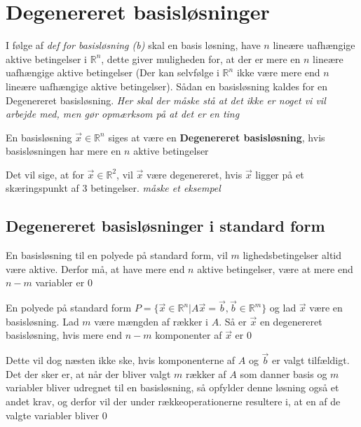 \section{Degenereret basisløsninger}
I følge af \textit{def for basisløsning (b)} skal en basis løsning, have $n$ lineære uafhængige aktive betingelser i $\mathds{R}^n$, dette giver muligheden for, at der er mere en $n$ lineære uafhængige aktive betingelser (Der kan selvfølge i $\mathds{R}^n$ ikke være mere end $n$ lineære uafhængige aktive betingelser). Sådan en basisløsning kaldes for en Degenereret basisløsning. \textit{Her skal der måske stå at det ikke er noget vi vil arbejde med, men gør opmærksom på at det er en ting}
\\
\begin{defn}
En basisløsning $\vec{x}\in \mathds{R}^n$ siges at være en \textbf{Degenereret basisløsning}, hvis basisløsningen har mere en $n$ aktive betingelser
\end{defn}

Det vil sige, at for $\vec{x}\in \mathds{R}^2$, vil $\vec{x}$ være degenereret, hvis $\vec{x}$ ligger på et skæringspunkt af $3$ betingelser.
\textit{måske et eksempel}\\
\subsection{Degenereret basisløsninger i standard form}
En basisløsning til en polyede på standard form, vil $m$ lighedsbetingelser altid være aktive. Derfor må, at have mere end $n$ aktive betingelser, være at mere end $n-m$ variabler er $0$
\begin{defn}
En polyede på standard form $P =\{ \vec{x} \in \mathds{R}^n | A \vec{x} = \vec{b}, \vec{b}\in \mathds{R}^m\}$ og lad $\vec{x}$ være en basisløsning. Lad $m$ være mængden af rækker i $A$. Så er $\vec{x}$ en degenereret basisløsning, hvis mere end $n-m$ komponenter af $\vec{x}$ er $0$
\end{defn}
Dette vil dog næsten ikke ske, hvis komponenterne af $A$ og $\vec{b}$ er valgt tilfældigt.
Det der sker er, at når der bliver valgt $m$ rækker af $A$ som danner basis og $m$ variabler bliver udregnet til en basisløsning, så opfylder denne løsning også et andet krav, og derfor vil der under rækkeoperationerne resultere i, at en af de valgte variabler bliver $0$
